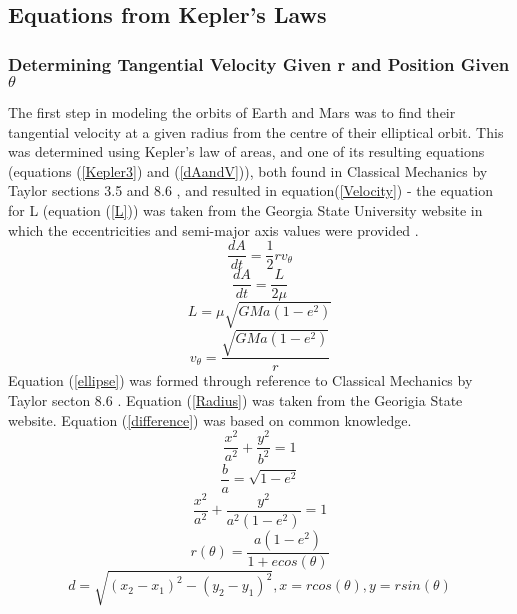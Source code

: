 %
\subsection{Equations from Kepler's Laws}
\subsubsection{Determining Tangential Velocity Given r and Position Given $\theta$}
\label{VelocitySection}
The first step in modeling the orbits of Earth and Mars was to find their tangential velocity at a given radius from
the centre of their elliptical orbit. This was determined using Kepler's law of areas, and one of its resulting 
equations (equations (\ref{Kepler3}) and (\ref{dAandV})), both found in Classical Mechanics by Taylor sections 3.5 and 
8.6 \cite{taylor_classical_2005}, and resulted in equation(\ref{Velocity}) - the equation for L (equation (\ref{L})) was taken from the Georgia State University website in which the eccentricities and semi-major axis values were provided \cite{noauthor_Keplers_nodate}. 
\begin{equation}
	\frac{dA}{dt} = \frac{1}{2}rv_{\theta}
	\label{Kepler3}
\end{equation}
\begin{equation}
	\frac{dA}{dt} = \frac{L}{2\mu}
	\label{dAandV}
\end{equation}
\begin{equation}
	L =\mu\sqrt{GMa(1-e^2)}
	\label{L}
\end{equation}
\begin{equation}
	v_{\theta} = \frac{\sqrt{GMa(1-e^2)}}{r}
	\label{Velocity}
\end{equation}
Equation (\ref{ellipse}) was formed through reference to Classical Mechanics by Taylor secton 8.6 \cite{taylor_classical_2005}. 
Equation (\ref{Radius}) was taken from the Georigia State website\cite{noauthor_Keplers_nodate}. Equation (\ref{difference}) was based on common
knowledge. 
\begin{equation}
	\frac{x^2}{a^2}+\frac{y^2}{b^2} = 1
\end{equation}
\begin{equation}
	\frac{b}{a} = \sqrt{1-e^2}
\end{equation}
\begin{equation}
	\frac{x^2}{a^2}+\frac{y^2}{a^2(1-e^2)} = 1
	\label{ellipse}
\end{equation}
\begin{equation}
	r(\theta) = \frac{a(1-e^2)}{1+ecos(\theta)}
	\label{Radius}
\end{equation}
\begin{equation}
	d = \sqrt{(x_{2} - x_{1})^2-(y_{2}-y_{1})^2}, x = rcos(\theta), y = rsin(\theta)
	\label{difference}
\end{equation}
